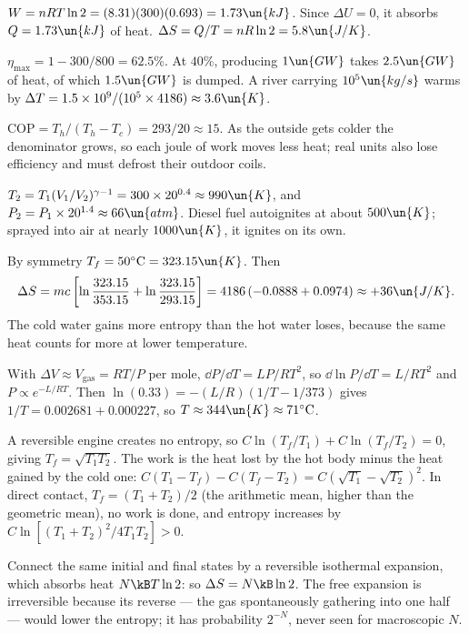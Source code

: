 
 $W = nRT\ln2 = (8.31)(300)(0.693) = 1.73\un{kJ}$. Since $\Delta U = 0$, it absorbs $Q = 1.73\un{kJ}$ of heat. $\Delta S = Q/T = nR\ln2 = 5.8\un{J/K}$.

 $\eta_{\max} = 1-300/800 = 62.5\%$. At $40\%$, producing $1\un{GW}$ takes $2.5\un{GW}$ of heat, of which $1.5\un{GW}$ is dumped. A river carrying $10^5\un{kg/s}$ warms by $\Delta T = 1.5\times10^9/(10^5\times4186)\approx3.6\un{K}$.

 $\text{COP} = T_h/(T_h-T_c) = 293/20\approx15$. As the outside gets colder the denominator grows, so each joule of work moves less heat; real units also lose efficiency and must defrost their outdoor coils.

 $T_2 = T_1(V_1/V_2)^{\gamma-1} = 300\times20^{0.4}\approx990\un{K}$, and $P_2 = P_1\times20^{1.4}\approx66\un{atm}$. Diesel fuel autoignites at about $500\un{K}$; sprayed into air at nearly $1000\un{K}$, it ignites on its own.

 By symmetry $T_f = 50^\circ\text{C} = 323.15\un{K}$. Then
\[
  \Delta S = mc\left[\ln\frac{323.15}{353.15} + \ln\frac{323.15}{293.15}\right] = 4186\,(-0.0888 + 0.0974)\approx+36\un{J/K}.
\]
The cold water gains more entropy than the hot water loses, because the same heat counts for more at lower temperature.

 With $\Delta V\approx V_{\text{gas}} = RT/P$ per mole, $\dd P/\dd T = LP/RT^2$, so $\dd\ln P/\dd T = L/RT^2$ and $P\propto e^{-L/RT}$. Then $\ln(0.33) = -(L/R)(1/T - 1/373)$ gives $1/T = 0.002681 + 0.000227$, so $T\approx344\un{K}\approx71^\circ\text{C}$.

 A reversible engine creates no entropy, so $C\ln(T_f/T_1) + C\ln(T_f/T_2) = 0$, giving $T_f = \sqrt{T_1T_2}$. The work is the heat lost by the hot body minus the heat gained by the cold one: $C(T_1-T_f) - C(T_f - T_2) = C(\sqrt{T_1}-\sqrt{T_2})^2$. In direct contact, $T_f = (T_1+T_2)/2$ (the arithmetic mean, higher than the geometric mean), no work is done, and entropy increases by $C\ln[(T_1+T_2)^2/4T_1T_2]>0$.

 Connect the same initial and final states by a reversible isothermal expansion, which absorbs heat $N\kB T\ln2$: so $\Delta S = N\kB\ln2$. The free expansion is irreversible because its reverse --- the gas spontaneously gathering into one half --- would lower the entropy; it has probability $2^{-N}$, never seen for macroscopic $N$.

